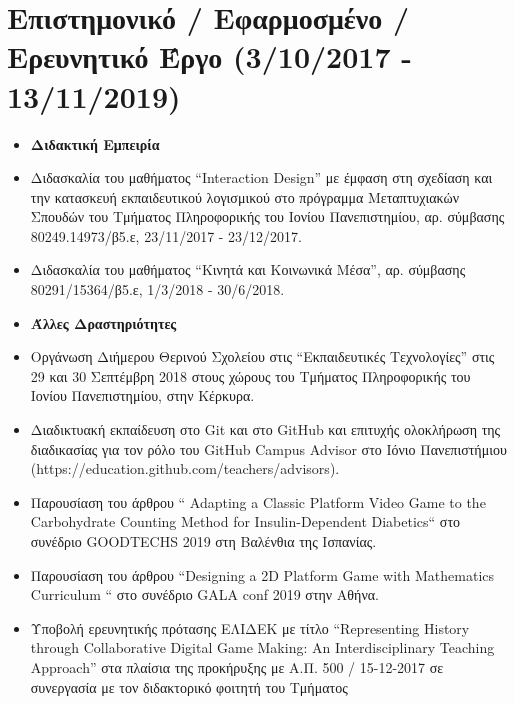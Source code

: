 \documentclass[%
    11pt,
  oneside
  ]{memoir}
\let\oldsection\section
\renewcommand{\section}[1]{%
  \oldsection{#1}
  \leavevmode
  \par
  \vspace{\dimexpr-\baselineskip-\parskip}
}
\begin{document}
\hypertarget{ux3b5ux3c0ux3b9ux3c3ux3c4ux3b7ux3bcux3bfux3bdux3b9ux3baux3cc-ux3b5ux3c6ux3b1ux3c1ux3bcux3bfux3c3ux3bcux3adux3bdux3bf-ux3b5ux3c1ux3b5ux3c5ux3bdux3b7ux3c4ux3b9ux3baux3cc-ux3adux3c1ux3b3ux3bf-3102017---13112019}{%
\section{Επιστημονικό / Εφαρμοσμένο / Ερευνητικό Έργο (3/10/2017 -
13/11/2019)}\label{ux3b5ux3c0ux3b9ux3c3ux3c4ux3b7ux3bcux3bfux3bdux3b9ux3baux3cc-ux3b5ux3c6ux3b1ux3c1ux3bcux3bfux3c3ux3bcux3adux3bdux3bf-ux3b5ux3c1ux3b5ux3c5ux3bdux3b7ux3c4ux3b9ux3baux3cc-ux3adux3c1ux3b3ux3bf-3102017---13112019}}

\begin{itemize}
\item
  \textbf{Διδακτική Εμπειρία}
\item
  Διδασκαλία του μαθήματος ``Interaction Design'' με έμφαση στη σχεδίαση
  και την κατασκευή εκπαιδευτικού λογισμικού στο πρόγραμμα Μεταπτυχιακών
  Σπουδών του Τμήματος Πληροφορικής του Ιονίου Πανεπιστημίου, αρ.
  σύμβασης 80249.14973/β5.ε, 23/11/2017 - 23/12/2017.
\item
  Διδασκαλία του μαθήματος ``Κινητά και Κοινωνικά Μέσα'', αρ. σύμβασης
  80291/15364/β5.ε, 1/3/2018 - 30/6/2018.
\item
  \textbf{Άλλες Δραστηριότητες}
\item
  Οργάνωση Διήμερου Θερινού Σχολείου στις ``Εκπαιδευτικές Τεχνολογίες''
  στις 29 και 30 Σεπτέμβρη 2018 στους χώρους του Τμήματος Πληροφορικής
  του Ιονίου Πανεπιστημίου, στην Κέρκυρα.
\item
  Διαδικτυακή εκπαίδευση στο Git και στο GitHub και επιτυχής ολοκλήρωση
  της διαδικασίας για τον ρόλο του GitHub Campus Advisor στο Ιόνιο
  Πανεπιστήμιου (https://education.github.com/teachers/advisors).
\item
  Παρουσίαση του άρθρου `` Adapting a Classic Platform Video Game to the
  Carbohydrate Counting Method for Insulin-Dependent Diabetics`` στο
  συνέδριο GOODTECHS 2019 στη Βαλένθια της Ισπανίας.
\item
  Παρουσίαση του άρθρου ``Designing a 2D Platform Game with Mathematics
  Curriculum `` στο συνέδριο GALA conf 2019 στην Αθήνα.
\item
  Υποβολή ερευνητικής πρότασης ΕΛΙΔΕΚ με τίτλο ``Representing History
  through Collaborative Digital Game Making: An Interdisciplinary
  Teaching Approach'' στα πλαίσια της προκήρυξης με Α.Π. 500 /
  15-12-2017 σε συνεργασία με τον διδακτορικό φοιτητή του Tμήματος

\end{itemize}
\end{document}
